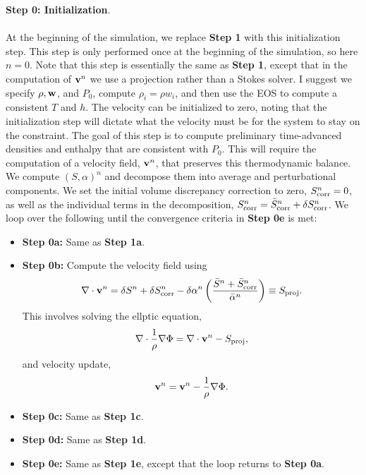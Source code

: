 \documentclass[final]{siamltex}
\def\vb {{\bf v}}
\def\wb {{\bf w}}
\begin{document}
{\bf Step 0: Initialization}.\\ \\
At the beginning of the simulation, we replace {\bf Step 1} with this initialization step.
This step is only performed once at the beginning of the simulation, so here $n=0$.
Note that this step is essentially the same as
{\bf Step 1}, except that in the computation of $\vb^n$ we use a projection rather
than a Stokes solver.
I suggest we specify $\rho,\wb$, and $P_0$, compute $\rho_i = \rho w_i$,
and then use the EOS to compute a consistent
$T$ and $h$.  The velocity can be initialized to zero, noting that the
initialization step will dictate what the velocity must be for the system to stay
on the constraint.
The goal of this step is to compute preliminary time-advanced densities and enthalpy
that are consistent with $P_0$.  This will
require the computation of a velocity field, $\vb^n$, that preserves this
thermodynamic balance.
We compute $(S,\alpha)^n$ and decompose them
into average and perturbational components.
We set the initial volume discrepancy correction to zero, 
$S_{\rm corr}^n = 0$, as well as the individual terms in the decomposition,
$S_{\rm corr}^n = \bar{S}_{\rm corr}^n + \delta S_{\rm corr}^n$.
We loop over the following until the convergence criteria in {\bf Step 0e} is met:\\
\begin{itemize}
\item {\bf Step 0a:} Same as {\bf Step 1a}.
\item {\bf Step 0b:} Compute the velocity field using
\begin{equation}
\nabla\cdot\vb^n = \delta S^n + \delta S_{\rm corr}^n - \delta\alpha^n\left(\frac{\bar{S}^n + \bar{S}_{\rm corr}^n}{\bar{\alpha}^n}\right) \equiv S_{\rm proj}.
\end{equation}
This involves solving the ellptic equation,
\begin{equation}
\nabla\cdot\frac{1}{\rho}\nabla\Phi = \nabla\cdot\vb^n - S_{\rm proj},
\end{equation}
and velocity update,
\begin{equation}
\vb^n = \vb^n - \frac{1}{\rho}\nabla\Phi.
\end{equation}

\item {\bf Step 0c:} Same as {\bf Step 1c}.
\item {\bf Step 0d:} Same as {\bf Step 1d}.
\item {\bf Step 0e:} Same as {\bf Step 1e}, except that the loop returns to {\bf Step 0a}.
\end{itemize}
\end{document}
